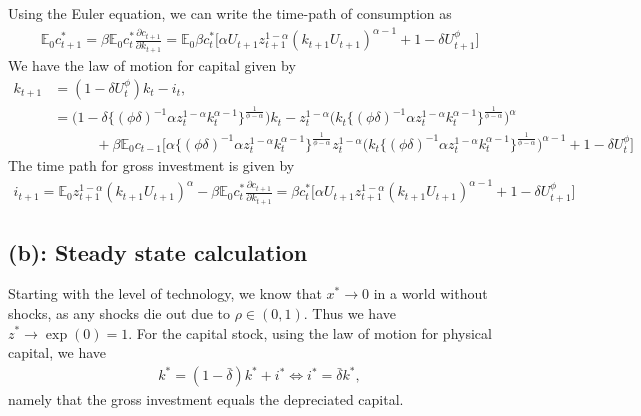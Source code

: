 \documentclass[a4paper]{article}
\theoremstyle{definition}
\begin{document}
Using the Euler equation, we can write the time-path of consumption as
	\begin{align*}
	\mathbb E_0 c_{t+1}^* = \beta \mathbb E_0 {c_{t}^*} \frac{\partial c_{t+1}}{\partial k_{t+1}} = \mathbb E_0\beta {c_t^*} \Big[ \alpha U_{t+1} z_{t+1}^{1-\alpha} (k_{t+1}U_{t+1})^{\alpha-1}+1-\delta U_{t+1}^\phi \Big]
	\end{align*}
We have the law of motion for capital given by
	\begin{align*}
	k_{t+1} 	&= (1-\delta U_t^\phi)k_t - i_t, \\
				&= \Big(1-\delta \Big\{ (\phi \delta)^{-1}  \alpha z_t^{1-\alpha} k_t^{\alpha-1} \Big\}^{\frac{1}{\phi-\alpha}} \Big)k_t -  z_t^{1-\alpha}\Big(k_t \Big\{ (\phi \delta)^{-1}  \alpha z_t^{1-\alpha} k_t^{\alpha-1} \Big\}^{\frac{1}{\phi-\alpha}} \Big)^\alpha  \\
				&\quad\quad\quad + \beta \mathbb E_0 {c_{t-1}}\Big[ \alpha \Big\{ (\phi \delta)^{-1}  \alpha z_t^{1-\alpha} k_t^{\alpha-1} \Big\}^{\frac{1}{\phi-\alpha}} z_t^{1-\alpha}\Big(k_t \Big\{ (\phi \delta)^{-1}  \alpha z_t^{1-\alpha} k_t^{\alpha-1} \Big\}^{\frac{1}{\phi-\alpha}} \Big)^{\alpha-1}+1-\delta U_t^\phi \Big]
	\end{align*}	
The time path for gross investment is given by
	\begin{align*}
	i_{t+1} = \mathbb E_0 z_{t+1}^{1-\alpha}(k_{t+1} U_{t+1})^\alpha - \beta \mathbb E_0 {c_{t}^*} \frac{\partial c_{t+1}}{\partial k_{t+1}} = \beta {c_t^*} \Big[ \alpha U_{t+1} z_{t+1}^{1-\alpha} (k_{t+1}U_{t+1})^{\alpha-1}+1-\delta U_{t+1}^\phi \Big]
	\end{align*}	


\subsection{(b): Steady state calculation}
Starting with the level of technology, we know that $x^* \rightarrow 0$ in a world without shocks, as any shocks die out due to $\rho \in (0,1)$. Thus we have $z^* \rightarrow \exp(0) = 1$. For the capital stock, using the law of motion for physical capital, we have
	\begin{align*}
	k^* = (1-\bar \delta)k^* + i^* \Leftrightarrow i^* = \bar\delta k^*,
	\end{align*}
namely that the gross investment equals the depreciated capital.	
\end{document}
